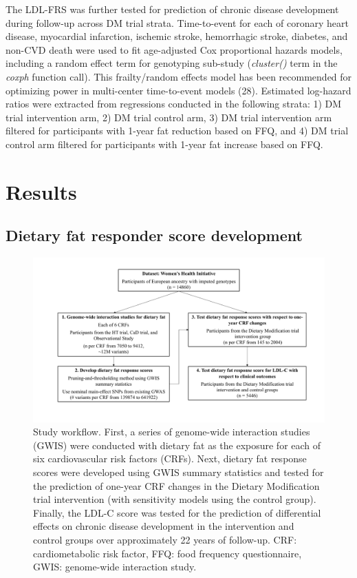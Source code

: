 \documentclass[]{article}
\begin{document}
The LDL-FRS was further tested for prediction of chronic disease
development during follow-up across DM trial strata. Time-to-event for
each of coronary heart disease, myocardial infarction, ischemic stroke,
hemorrhagic stroke, diabetes, and non-CVD death were used to fit
age-adjusted Cox proportional hazards models, including a random effect
term for genotyping sub-study (\emph{cluster()} term in the \emph{coxph}
function call). This frailty/random effects model has been recommended
for optimizing power in multi-center time-to-event models (28).
Estimated log-hazard ratios were extracted from regressions conducted in
the following strata: 1) DM trial intervention arm, 2) DM trial control
arm, 3) DM trial intervention arm filtered for participants with 1-year
fat reduction based on FFQ, and 4) DM trial control arm filtered for
participants with 1-year fat increase based on FFQ.

\hypertarget{results}{%
\section{Results}\label{results}}

\hypertarget{dietary-fat-responder-score-development}{%
\subsection{Dietary fat responder score
development}\label{dietary-fat-responder-score-development}}

\begin{figure}
\centering
\includegraphics{workflow.pdf}
\caption{Study workflow. First, a series of genome-wide interaction
studies (GWIS) were conducted with dietary fat as the exposure for each
of six cardiovascular risk factors (CRFs). Next, dietary fat response
scores were developed using GWIS summary statistics and tested for the
prediction of one-year CRF changes in the Dietary Modification trial
intervention (with sensitivity models using the control group). Finally,
the LDL-C score was tested for the prediction of differential effects on
chronic disease development in the intervention and control groups over
approximately 22 years of follow-up. CRF: cardiometabolic risk factor,
FFQ: food frequency questionnaire, GWIS: genome-wide interaction study.}
\end{figure}
\end{document}
